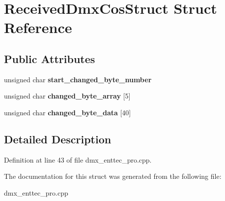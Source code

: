 \hypertarget{structReceivedDmxCosStruct}{\section{Received\-Dmx\-Cos\-Struct Struct Reference}
\label{structReceivedDmxCosStruct}
}
\subsection*{Public Attributes}
\begin{DoxyCompactItemize}
\item 
\hypertarget{structReceivedDmxCosStruct_a4cf39b60236997522f11155b63b2f090}{unsigned char {\bfseries start\-\_\-changed\-\_\-byte\-\_\-number}}\label{structReceivedDmxCosStruct_a4cf39b60236997522f11155b63b2f090}

\item 
\hypertarget{structReceivedDmxCosStruct_a863941290eeb0f634dd83aa8a2389718}{unsigned char {\bfseries changed\-\_\-byte\-\_\-array} \mbox{[}5\mbox{]}}\label{structReceivedDmxCosStruct_a863941290eeb0f634dd83aa8a2389718}

\item 
\hypertarget{structReceivedDmxCosStruct_aa3984590d4af300c37c465375dd7ba0f}{unsigned char {\bfseries changed\-\_\-byte\-\_\-data} \mbox{[}40\mbox{]}}\label{structReceivedDmxCosStruct_aa3984590d4af300c37c465375dd7ba0f}

\end{DoxyCompactItemize}


\subsection{Detailed Description}


Definition at line 43 of file dmx\-\_\-enttec\-\_\-pro.\-cpp.



The documentation for this struct was generated from the following file\-:\begin{DoxyCompactItemize}
\item 
dmx\-\_\-enttec\-\_\-pro.\-cpp\end{DoxyCompactItemize}
